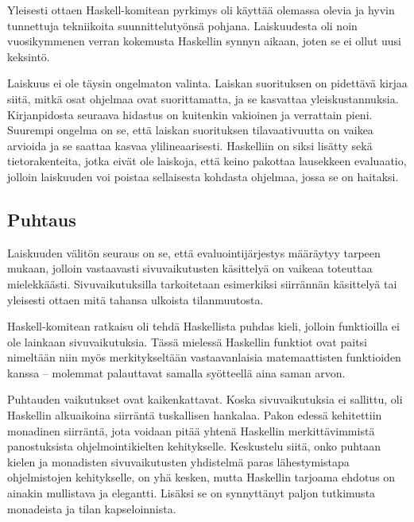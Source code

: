 \documentclass[finnish]{tktltiki2}
\begin{document}
Yleisesti ottaen Haskell-komitean pyrkimys oli käyttää olemassa olevia ja hyvin tunnettuja
tekniikoita suunnittelutyönsä pohjana. Laiskuudesta oli noin vuosikymmenen verran kokemusta
Haskellin synnyn aikaan, joten se ei ollut uusi keksintö.

Laiskuus ei ole täysin ongelmaton valinta. Laiskan suorituksen on pidettävä kirjaa siitä, mitkä osat
ohjelmaa ovat suorittamatta, ja se kasvattaa yleiskustannuksia. Kirjanpidosta seuraava hidastus on
kuitenkin vakioinen ja verrattain pieni. Suurempi ongelma on se, että laiskan suorituksen
tilavaativuutta on vaikea arvioida ja se saattaa kasvaa ylilineaarisesti. Haskelliin on siksi
lisätty sekä tietorakenteita, jotka eivät ole laiskoja, että keino pakottaa lausekkeen evaluaatio,
jolloin laiskuuden voi poistaa sellaisesta kohdasta ohjelmaa, jossa se on haitaksi.

\subsection{Puhtaus}



Laiskuuden välitön seuraus on se, että evaluointijärjestys määräytyy tarpeen mukaan, jolloin
vastaavasti sivuvaikutusten käsittelyä on vaikeaa toteuttaa mielekkäästi. Sivuvaikutuksilla
tarkoitetaan esimerkiksi siirrännän käsittelyä tai yleisesti ottaen mitä tahansa ulkoista
tilanmuutosta.

Haskell-komitean ratkaisu oli tehdä Haskellista puhdas kieli, jolloin funktioilla ei ole lainkaan
sivuvaikutuksia. Tässä mielessä Haskellin funktiot ovat paitsi nimeltään niin myös merkitykseltään
vastaavanlaisia matemaattisten funktioiden kanssa -- molemmat palauttavat samalla syötteellä aina
saman arvon.

Puhtauden vaikutukset ovat kaikenkattavat. Koska sivuvaikutuksia ei sallittu, oli Haskellin
alkuaikoina siirräntä tuskallisen hankalaa. Pakon edessä kehitettiin monadinen siirräntä, jota
voidaan pitää yhtenä Haskellin merkittävimmistä panostuksista ohjelmointikielten kehitykselle.
Keskustelu siitä, onko puhtaan kielen ja monadisten sivuvaikutusten yhdistelmä paras lähestymistapa
ohjelmistojen kehitykselle, on yhä kesken, mutta Haskellin tarjoama ehdotus on ainakin mullistava ja
elegantti. Lisäksi se on synnyttänyt paljon tutkimusta monadeista ja tilan kapseloinnista.
\end{document}
